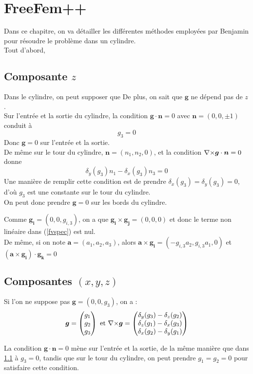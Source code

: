 \section{FreeFem++}
Dans ce chapitre, on va détailler les différentes méthodes employées par Benjamin pour résoudre le problème dans un cylindre.\\
Tout d'abord, 

\subsection{Composante $z$}
\label{freefem1d}
Dans le cylindre, on peut supposer que 
De plus, on sait que $\bm{g}$ ne dépend pas de $z$.\\
Sur l'entrée et la sortie du cylindre, la condition $\bm{g}\cdot \bm{n}=0$ avec $\bm{n}=(0,0,\pm 1)$ conduit à \[g_3 = 0\]
Donc $\bm{g}=0$ sur l'entrée et la sortie.\\

De même sur le tour du cylindre, $\bm{n}=(n_1,n_2,0)$, et la condition ${\nabla\times}\bm{g}\cdot\bm{n}=0$ donne \[\delta_y(g_3)n_1-\delta_x(g_3)n_3=0\]
Une manière de remplir cette condition est de prendre $\delta_x(g_3)=\delta_y(g_3)=0$, d'où $g_3$ est une constante sur le tour du cylindre.\\
On peut donc prendre $\bm{g}=0$ sur les bords du cylindre.

Comme $\bm{g_i}=(0,0,g_{i,3})$, on a que $\bm{g_i}\times\bm{g_j}=(0,0,0)$ et donc le terme non linéaire dans (\ref{fvspec}) est nul.\\
De même, si on note $\bm{a}=(a_1,a_2,a_3)$, alors $\bm{a}\times\bm{g_i}=(-g_{i,3}a_2, g_{i,3}a_1, 0)$ et $(\bm{a}\times\bm{g_i})\cdot\bm{g_k}=0$

\subsection{Composantes $(x,y,z)$}
Si l'on ne suppose pas $\bm{g}=(0,0,g_3)$, on a : 
\[
\bm{g}=
\begin{pmatrix}
g_1\\
g_2\\
g_3
\end{pmatrix}
\text{ et }
{\nabla\times}\bm{g}=
\begin{pmatrix}
\delta_y(g_3)-\delta_z(g_2)\\
\delta_z(g_1)-\delta_x(g_3)\\
\delta_x(g_2)-\delta_y(g_1)
\end{pmatrix}
\]

La condition $\bm{g}\cdot\bm{n}=0$ mène sur l'entrée et la sortie, de la même manière que dans \ref{freefem1d} à $g_3=0$, tandis que sur le tour du cylindre, on peut prendre $g_1=g_2=0$ pour satisfaire cette condition.\\

